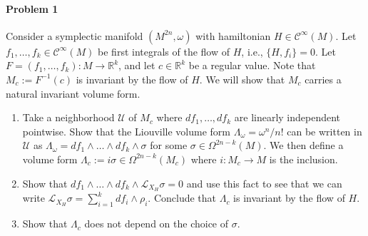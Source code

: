\paragraph{Problem 1} Consider a symplectic manifold $(M^{2n},\omega)$ with hamiltonian $H\in\mathcal{C}^\infty(M)$. Let $f_1,\ldots,f_k\in\mathcal{C}^\infty(M)$ be first integrals of the flow of $H$, i.e., $\{H,f_i\} =0$. Let $F=(f_1,\ldots,f_k):M\longrightarrow \mathbb{R}^{k}$, and let $c \in\mathbb{R}^{k}$ be a regular value. Note that $M_c:=F^{-1}(c)$ is invariant by the flow of $H$. We will show that  $M_c$ carries a natural invariant volume form.
\begin{enumerate}[label=\alph*.]
	\item Take a neighborhood $\mathcal{U}$ of $M_{c}$ where $df_1,\ldots,df_k$ are linearly independent pointwise. Show that the Liouville volume form $\Lambda_\omega=\omega^n/n!$ can be written in $\mathcal{U}$ as $\Lambda_\omega=df_1\wedge \ldots \wedge df_k\wedge \sigma$ for some $\sigma\in\Omega^{2n-k}(M)$. We then define a volume form $\Lambda_c:= i\sigma\in\Omega^{2n-k}(M_c)$ where $i:M_c\to M$ is the inclusion.
	\item Show that $df_1\wedge \ldots \wedge df_k\wedge  \mathcal{L}_{X_H}\sigma=0$ and use this fact to see that we can write $\mathcal{L}_{X_H}\sigma=\sum_{i=1}^kdf_i\wedge \rho_i$. Conclude that $\Lambda_c$ is invariant by the flow of $H$.
	 \item Show that $\Lambda_c$ does not depend on the choice of $\sigma$.
\end{enumerate}

